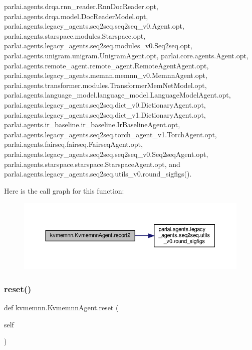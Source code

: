 parlai.\+agents.\+drqa.\+rnn\+\_\+reader.\+Rnn\+Doc\+Reader.\+opt, parlai.\+agents.\+drqa.\+model.\+Doc\+Reader\+Model.\+opt, parlai.\+agents.\+legacy\+\_\+agents.\+seq2seq.\+seq2seq\+\_\+v0.\+Agent.\+opt, parlai.\+agents.\+starspace.\+modules.\+Starspace.\+opt, parlai.\+agents.\+legacy\+\_\+agents.\+seq2seq.\+modules\+\_\+v0.\+Seq2seq.\+opt, parlai.\+agents.\+unigram.\+unigram.\+Unigram\+Agent.\+opt, parlai.\+core.\+agents.\+Agent.\+opt, parlai.\+agents.\+remote\+\_\+agent.\+remote\+\_\+agent.\+Remote\+Agent\+Agent.\+opt, parlai.\+agents.\+legacy\+\_\+agents.\+memnn.\+memnn\+\_\+v0.\+Memnn\+Agent.\+opt, parlai.\+agents.\+transformer.\+modules.\+Transformer\+Mem\+Net\+Model.\+opt, parlai.\+agents.\+language\+\_\+model.\+language\+\_\+model.\+Language\+Model\+Agent.\+opt, parlai.\+agents.\+legacy\+\_\+agents.\+seq2seq.\+dict\+\_\+v0.\+Dictionary\+Agent.\+opt, parlai.\+agents.\+legacy\+\_\+agents.\+seq2seq.\+dict\+\_\+v1.\+Dictionary\+Agent.\+opt, parlai.\+agents.\+ir\+\_\+baseline.\+ir\+\_\+baseline.\+Ir\+Baseline\+Agent.\+opt, parlai.\+agents.\+legacy\+\_\+agents.\+seq2seq.\+torch\+\_\+agent\+\_\+v1.\+Torch\+Agent.\+opt, parlai.\+agents.\+fairseq.\+fairseq.\+Fairseq\+Agent.\+opt, parlai.\+agents.\+legacy\+\_\+agents.\+seq2seq.\+seq2seq\+\_\+v0.\+Seq2seq\+Agent.\+opt, parlai.\+agents.\+starspace.\+starspace.\+Starspace\+Agent.\+opt, and parlai.\+agents.\+legacy\+\_\+agents.\+seq2seq.\+utils\+\_\+v0.\+round\+\_\+sigfigs().

Here is the call graph for this function\+:
\nopagebreak
\begin{figure}[H]
\begin{center}
\leavevmode
\includegraphics[width=350pt]{classkvmemnn_1_1KvmemnnAgent_af8c3f5e8c17e1f1355eb2e416fd92e26_cgraph}
\end{center}
\end{figure}
\mbox{\label{classkvmemnn_1_1KvmemnnAgent_aaa32e10a82350c998426e2731a4afb9e}} 
\subsubsection{\texorpdfstring{reset()}{reset()}}
{\footnotesize\ttfamily def kvmemnn.\+Kvmemnn\+Agent.\+reset (\begin{DoxyParamCaption}\item[{}]{self }\end{DoxyParamCaption})}


